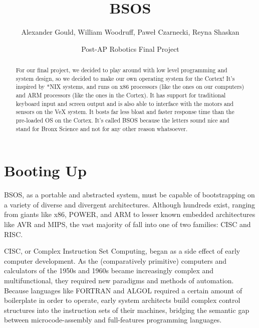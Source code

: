\documentclass[english]{article}
\begin{document}
\title{BSOS}


\author{Alexander Gould, William Woodruff, Pawe\l{} Czarnecki, Reyna Shaskan}


\date{Post-AP Robotics Final Project}
\maketitle
\begin{abstract}
For our final project, we decided to play around with low level programming
and system design, so we decided to make our own operating system
for the Cortex! It's inspired by {*}NIX systems, and runs on x86 processors
(like the ones on our computers) and ARM processors (like the ones
in the Cortex). It has support for traditional keyboard input and
screen output and is also able to interface with the motors and sensors
on the VeX system. It bosts far less bloat and faster response time
than the pre-loaded OS on the Cortex. It's called BSOS because the
letters sound nice and stand for Bronx Science and not for any other reason whatsoever.
\end{abstract}

\part{Booting Up}
BSOS, as a portable and abstracted system, must be capable of bootstrapping on a variety of diverse and divergent architectures. Although hundreds exist, ranging from giants like x86, POWER, and ARM to lesser known embedded architectures like AVR and MIPS, the vast majority of fall into one of two families: CISC and RISC.

CISC, or Complex Instruction Set Computing, began as a side effect of early computer development. As the (comparatively primitive) computers and calculators of the 1950s and 1960s became increasingly complex and multifunctional, they required new paradigms and methods of automation. Because languages like FORTRAN and ALGOL required a certain amount of boilerplate in order to operate, early system architects build complex control structures into the instruction sets of their machines, bridging the semantic gap between microcode-assembly and full-features programming languages.
\end{document}
